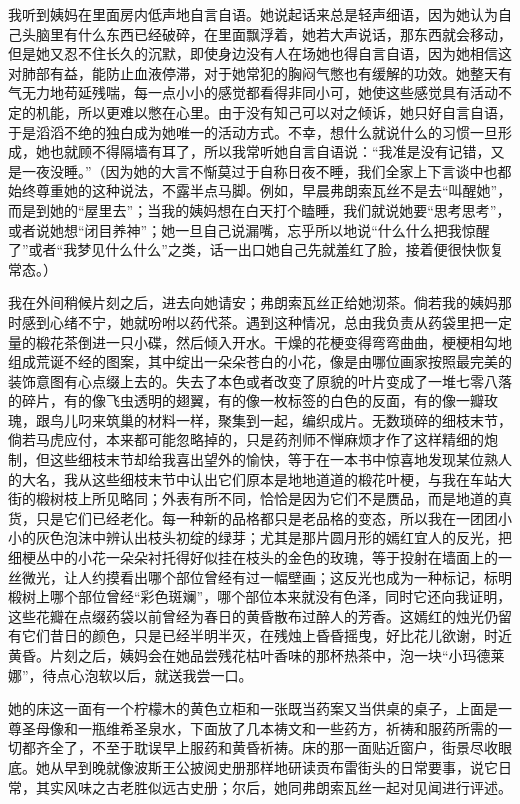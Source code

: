 \par 我听到姨妈在里面房内低声地自言自语。她说起话来总是轻声细语，因为她认为自己头脑里有什么东西已经破碎，在里面飘浮着，她若大声说话，那东西就会移动，但是她又忍不住长久的沉默，即使身边没有人在场她也得自言自语，因为她相信这对肺部有益，能防止血液停滞，对于她常犯的胸闷气憋也有缓解的功效。她整天有气无力地苟延残喘，每一点小小的感觉都看得非同小可，她使这些感觉具有活动不定的机能，所以更难以憋在心里。由于没有知己可以对之倾诉，她只好自言自语，于是滔滔不绝的独白成为她唯一的活动方式。不幸，想什么就说什么的习惯一旦形成，她也就顾不得隔墙有耳了，所以我常听她自言自语说：“我准是没有记错，又是一夜没睡。”（因为她的大言不惭莫过于自称日夜不睡，我们全家上下言谈中也都始终尊重她的这种说法，不露半点马脚。例如，早晨弗朗索瓦丝不是去“叫醒她”，而是到她的“屋里去”；当我的姨妈想在白天打个瞌睡，我们就说她要“思考思考”，或者说她想“闭目养神”；她一旦自己说漏嘴，忘乎所以地说“什么什么把我惊醒了”或者“我梦见什么什么”之类，话一出口她自己先就羞红了脸，接着便很快恢复常态。）
\par 我在外间稍候片刻之后，进去向她请安；弗朗索瓦丝正给她沏茶。倘若我的姨妈那时感到心绪不宁，她就吩咐以药代茶。遇到这种情况，总由我负责从药袋里把一定量的椴花茶倒进一只小碟，然后倾入开水。干燥的花梗变得弯弯曲曲，梗梗相勾地组成荒诞不经的图案，其中绽出一朵朵苍白的小花，像是由哪位画家按照最完美的装饰意图有心点缀上去的。失去了本色或者改变了原貌的叶片变成了一堆七零八落的碎片，有的像飞虫透明的翅翼，有的像一枚标签的白色的反面，有的像一瓣玫瑰，跟鸟儿叼来筑巢的材料一样，聚集到一起，编织成片。无数琐碎的细枝末节，倘若马虎应付，本来都可能忽略掉的，只是药剂师不惮麻烦才作了这样精细的炮制，但这些细枝末节却给我喜出望外的愉快，等于在一本书中惊喜地发现某位熟人的大名，我从这些细枝末节中认出它们原本是地地道道的椴花叶梗，与我在车站大街的椴树枝上所见略同；外表有所不同，恰恰是因为它们不是赝品，而是地道的真货，只是它们已经老化。每一种新的品格都只是老品格的变态，所以我在一团团小小的灰色泡沫中辨认出枝头初绽的绿芽；尤其是那片圆月形的嫣红宜人的反光，把细梗丛中的小花一朵朵衬托得好似挂在枝头的金色的玫瑰，等于投射在墙面上的一丝微光，让人约摸看出哪个部位曾经有过一幅壁画；这反光也成为一种标记，标明椴树上哪个部位曾经“彩色斑斓”，哪个部位本来就没有色泽，同时它还向我证明，这些花瓣在点缀药袋以前曾经为春日的黄昏散布过醉人的芳香。这嫣红的烛光仍留有它们昔日的颜色，只是已经半明半灭，在残烛上昏昏摇曳，好比花儿欲谢，时近黄昏。片刻之后，姨妈会在她品尝残花枯叶香味的那杯热茶中，泡一块“小玛德莱娜”，待点心泡软以后，就送我尝一口。
\par 她的床这一面有一个柠檬木的黄色立柜和一张既当药案又当供桌的桌子，上面是一尊圣母像和一瓶维希圣泉水，下面放了几本祷文和一些药方，祈祷和服药所需的一切都齐全了，不至于耽误早上服药和黄昏祈祷。床的那一面贴近窗户，街景尽收眼底。她从早到晚就像波斯王公披阅史册那样地研读贡布雷街头的日常要事，说它日常，其实风味之古老胜似远古史册；尔后，她同弗朗索瓦丝一起对见闻进行评述。
